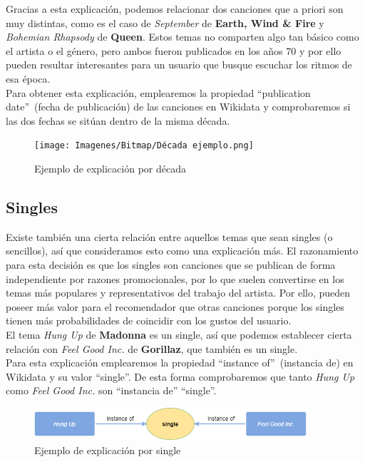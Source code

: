 Gracias a esta explicación, podemos relacionar dos canciones que a priori son muy distintas, como es el caso de \textit{September} de \textbf{Earth, Wind \& Fire} y \textit{Bohemian Rhapsody} de \textbf{Queen}. Estos temas no comparten algo tan básico como el artista o el género, pero ambos fueron publicados en los años 70 y por ello pueden resultar interesantes para un usuario que busque escuchar los ritmos de esa época.\\

Para obtener esta explicación, emplearemos la propiedad ``publication date''~(fecha de publicación) de las canciones en Wikidata y comprobaremos si las dos fechas se sitúan dentro de la misma década.\\

\begin{figure}[h!]
	\centering
	\texttt{[image: Imagenes/Bitmap/Década ejemplo.png]}
	\caption{Ejemplo de explicación por década}
	\label{fig:sampleImage}
\end{figure}

\subsection*{Singles}

Existe también una cierta relación entre aquellos temas que sean singles (o sencillos), así que consideramos esto como una explicación más. El razonamiento para esta decisión es que los singles son canciones que se publican de forma independiente por razones promocionales, por lo que suelen convertirse en los temas más populares y representativos del trabajo del artista. Por ello, pueden poseer más valor para el recomendador que otras canciones porque los singles tienen más probabilidades de coincidir con los gustos del usuario.\\

El tema \textit{Hung Up} de \textbf{Madonna} es un single, así que podemos establecer cierta relación con \textit{Feel Good Inc.} de \textbf{Gorillaz}, que también es un single.\\

Para esta explicación emplearemos la propiedad ``instance of''~(instancia de) en Wikidata y su valor ``single''. De esta forma comprobaremos que tanto \textit{Hung Up} como \textit{Feel Good Inc.} son ``instancia de'' ``single''.\\

\begin{figure}[h!]
	\centering
	\includegraphics[width = 0.9\textwidth]{Imagenes/Bitmap/Single ejemplo.png}
	\caption{Ejemplo de explicación por single}
	\label{fig:sampleImage}
\end{figure}

